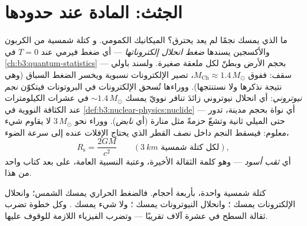 \section{الجثث: المادة عند حدودها}

\begin{proposition}\label{prop:b3:astrophysics:compact}
ما الذي يمسك نجمًا لم يعد يحترق؟ الميكانيك الكمومي. و\emph{} كتلة شمسية من الكربون والأكسجين يسندها
\emph{ضغط انحلال إلكتروناتها} --- أي ضغط فيرمي عند $T = 0$
في \cref{ch:b3:quantum-statistics} --- بحجم
الأرض وبطنّ لكل ملعقة صغيرة. ولسند باولي
سقف: ففوق \emph{} $M_{\text{Ch}}
\approx 1.4\,M_\odot$، تصير الإلكترونات نسبوية ويخسر
الضغط السباق (وهي نتيجة نذكرها ولا نستنتجها). ووراءها
تُسحق الإلكترونات في البروتونات فيتكوّن \emph{نجم نيوتروني}:
أي انحلال نيوتروني زائدَ تنافر نوويّ يمسك
$\sim1.4\,M_\odot$ في عشرات الكيلومترات عند الكثافة
النووية في \cref{def:b3:nuclear-physics:nuclide} --- أي
نواة بحجم مدينة، تدور حتى الميلي ثانية وتشعّ حزمةً مثل
منارة (أي \emph{نابض}). ووراء نحو $3\,M_\odot$
لا يقاوم شيء معلوم: فيسقط النجم داخل نصف القطر الذي يحتاج
الإفلات عنده إلى سرعة الضوء،
\[
R_{\text{s}} = \frac{2GM}{c^2}
\qquad (\qty{3}{km}\text{ لكل كتلة شمسية}) ,
\]
أي \emph{ثقب أسود} --- وهو كلمة الثقالة الأخيرة، وعتبة
النسبية العامة، على بعد كتاب واحد من هذا.
\end{proposition}
\admitted

\begin{omfigure}

{\small كتلة شمسية واحدة، بأربعة أحجام. فالضغط الحراري يمسك
الشمس؛ وانحلال الإلكترونات يمسك ؛ وانحلال النيوترونات يمسك
؛ ولا شيء يمسك . وكل خطوة تضرب
ثقالة السطح في عشرة آلاف تقريبًا --- وتضرب الفيزياء اللازمة
للوقوف عليها.}
\end{omfigure}

